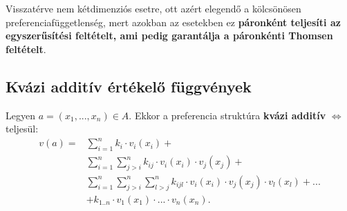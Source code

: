 \documentclass[a4paper,12pt]{article}
\begin{document}

Visszatérve nem kétdimenziós esetre, ott azért elegendő a kölcsönösen preferenciafüggetlenség, mert azokban az esetekben ez \textbf{páronként teljesíti az egyszerűsítési feltételt, ami pedig garantálja a páronkénti Thomsen feltételt}.

\subsection{Kvázi additív értékelő függvények}
Legyen $a=(x_1, ... , x_n) \in A$. Ekkor a preferencia struktúra \textbf{kvázi additív} $\Leftrightarrow$ teljesül: 
\begin{equation}
\begin{split}
v(a) = & \sum_{i=1}^n k_i \cdot v_i(x_i)+ \\
&\sum_{i=1}^n \sum_{j>i}^n k_{ij} \cdot v_i(x_i) \cdot v_j(x_j) + \\
&\sum_{i=1}^n \sum_{j>i}^n \sum_{l>j}^n k_{ijl} \cdot v_i(x_i)\cdot v_j(x_j)\cdot v_l(x_l) + ... \\ 
&+k_{1..n}\cdot v_1(x_1)\cdot  ... \cdot  v_n(x_n). \\
\end{split}
\end{equation} 
\end{document}
